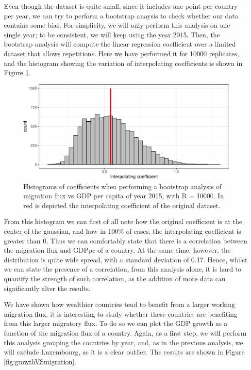\documentclass[
]{article}
\begin{document}
Even though the dataset is quite small, since it includes one point per
country per year, we can try to perform a bootstrap anaysis to check
whether our data contains some bias. For simplicity, we will only
perform this analysis on one single year; to be consistent, we will keep
using the year 2015. Then, the bootstrap analysis will compute the
linear regression coefficient over a limited dataset that allows
repetitions. Here we have performed it for 10000 replicates, and the
histogram showing the variation of interpolating coefficients is shown
in Figure \ref{fig:bootModel}.

\begin{figure}
\centering
\includegraphics{main_files/figure-latex/bootModel-1.pdf}
\caption{Histograms of coefficients when performing a bootstrap analysis
of migration flux vs GDP per capita of year 2015, with R = 10000. In red
is depicted the interpolating coefficient of the original dataset.
\label{fig:bootModel}}
\end{figure}

From this histogram we can first of all note how the original
coefficient is at the center of the gaussian, and how in 100\% of cases,
the interpolating coefficient is greater than 0. Thus we can comfortably
state that there is a correlation between the migration flux and GDPpc
of a country. At the same time, however, the distribution is quite wide
spread, with a standard deviation of 0.17. Hence, whilst we can state
the presence of a correlation, from this analysis alone, it is hard to
quantify the strength of such correlation, as the addition of more data
can significantly alter the results.

We have shown how wealthier countries tend to benefit from a larger
working migration flux, it is interesting to study whether these
countries are benefiting from this larger migratory flux. To do so we
can plot the GDP growth as a function of the migration flux of a
country. Again, as a first step, we will perform this analysis grouping
the countries by year, and, as in the previous analysis, we will exclude
Luxembourg, as it is a clear outlier. The results are shown in Figure
\ref{fig:growthVSmigration}.
\end{document}
